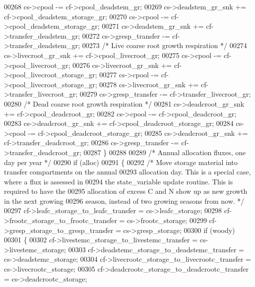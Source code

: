 \begin{DoxyCode}
{00268         cs->cpool            -= cf->cpool\_deadstem\_gr;
00269         cs->deadstem\_gr\_snk  += cf->cpool\_deadstem\_storage\_gr;
00270         cs->cpool            -= cf->cpool\_deadstem\_storage\_gr;
00271         cs->deadstem\_gr\_snk  += cf->transfer\_deadstem\_gr;
00272         cs->gresp\_transfer   -= cf->transfer\_deadstem\_gr;
00273         \textcolor{comment}{/* Live coarse root growth respiration */} 
00274         cs->livecroot\_gr\_snk += cf->cpool\_livecroot\_gr;
00275         cs->cpool            -= cf->cpool\_livecroot\_gr;
00276         cs->livecroot\_gr\_snk += cf->cpool\_livecroot\_storage\_gr;
00277         cs->cpool            -= cf->cpool\_livecroot\_storage\_gr;
00278         cs->livecroot\_gr\_snk += cf->transfer\_livecroot\_gr;
00279         cs->gresp\_transfer   -= cf->transfer\_livecroot\_gr;
00280         \textcolor{comment}{/* Dead coarse root growth respiration */} 
00281         cs->deadcroot\_gr\_snk += cf->cpool\_deadcroot\_gr;
00282         cs->cpool            -= cf->cpool\_deadcroot\_gr;
00283         cs->deadcroot\_gr\_snk += cf->cpool\_deadcroot\_storage\_gr;
00284         cs->cpool            -= cf->cpool\_deadcroot\_storage\_gr;
00285         cs->deadcroot\_gr\_snk += cf->transfer\_deadcroot\_gr;
00286         cs->gresp\_transfer   -= cf->transfer\_deadcroot\_gr;
00287     \}
00288     
00289     \textcolor{comment}{/* Annual allocation fluxes, one day per year */}
00290     \textcolor{keywordflow}{if} (alloc)
00291     \{
00292         \textcolor{comment}{/* Move storage material into transfer compartments on the annual}
00293 \textcolor{comment}{        allocation day. This is a special case, where a flux is assessed in}
00294 \textcolor{comment}{        the state\_variable update routine.  This is required to have the}
00295 \textcolor{comment}{        allocation of excess C and N show up as new growth in the next growing}
00296 \textcolor{comment}{        season, instead of two growing seasons from now. */}
00297         cf->leafc\_storage\_to\_leafc\_transfer = cs->leafc\_storage;
00298         cf->frootc\_storage\_to\_frootc\_transfer = cs->frootc\_storage;
00299         cf->gresp\_storage\_to\_gresp\_transfer = cs->gresp\_storage;
00300         \textcolor{keywordflow}{if} (woody)
00301         \{
00302             cf->livestemc\_storage\_to\_livestemc\_transfer = cs->livestemc\_storage;
00303             cf->deadstemc\_storage\_to\_deadstemc\_transfer = cs->deadstemc\_storage;
00304             cf->livecrootc\_storage\_to\_livecrootc\_transfer = cs->livecrootc\_storage;
00305             cf->deadcrootc\_storage\_to\_deadcrootc\_transfer = cs->deadcrootc\_storage;
}
\end{DoxyCode}
